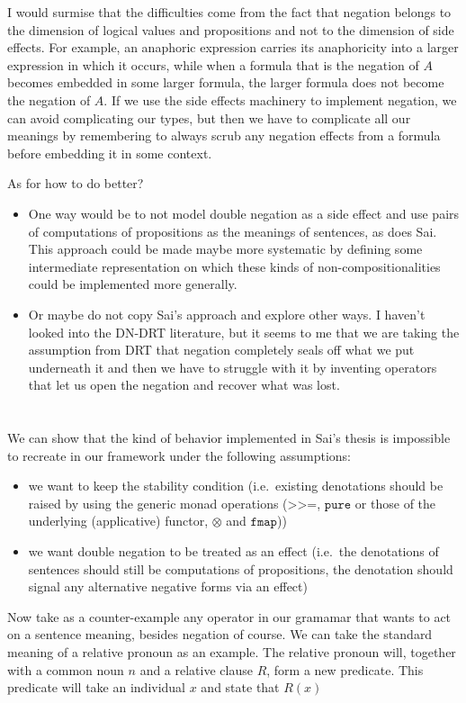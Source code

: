 \documentclass[a4paper,11pt,DIV=12]{scrartcl}
\newcommand{\hsbind}{\mathbin{\texttt{>>=}}}
\begin{document}
I would surmise that the difficulties come from the fact that negation
belongs to the dimension of logical values and propositions and not to the
dimension of side effects. For example, an anaphoric expression carries its
anaphoricity into a larger expression in which it occurs, while when a
formula that is the negation of $A$ becomes embedded in some larger
formula, the larger formula does not become the negation of $A$. If we use
the side effects machinery to implement negation, we can avoid complicating
our types, but then we have to complicate all our meanings by remembering
to always scrub any negation effects from a formula before embedding it in
some context.

As for how to do better?

\begin{itemize}
\item One way would be to not model double negation as a side effect and
  use pairs of computations of propositions as the meanings of sentences,
  as does Sai. This approach could be made maybe more systematic by
  defining some intermediate representation on which these kinds of
  non-compositionalities could be implemented more generally.
\item Or maybe do not copy Sai's approach and explore other ways. I haven't
  looked into the DN-DRT literature, but it seems to me that we are taking
  the assumption from DRT that negation completely seals off what we put
  underneath it and then we have to struggle with it by inventing operators
  that let us open the negation and recover what was lost.
\end{itemize}

\section{}

We can show that the kind of behavior implemented in Sai's thesis is
impossible to recreate in our framework under the following assumptions:

\begin{itemize}
\item we want to keep the stability condition (i.e.\ existing denotations
  should be raised by using the generic monad operations ($\hsbind$,
  $\texttt{pure}$ or those of the underlying (applicative) functor,
  $\otimes$ and $\texttt{fmap}$))
\item we want double negation to be treated as an effect (i.e.\ the
  denotations of sentences should still be computations of propositions,
  the denotation should signal any alternative negative forms via an
  effect)
\end{itemize}

Now take as a counter-example any operator in our gramamar that wants to
act on a sentence meaning, besides negation of course. We can take the
standard meaning of a relative pronoun as an example. The relative pronoun
will, together with a common noun $n$ and a relative clause $R$, form a new
predicate. This predicate will take an individual $x$ and state that $R(x)$
\end{document}
